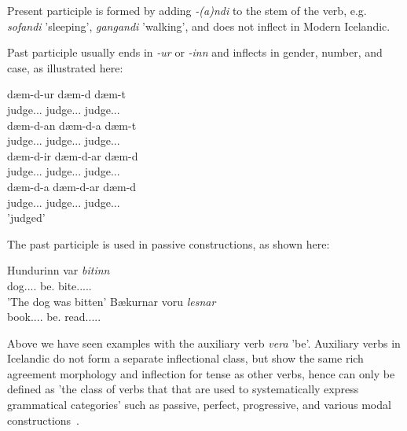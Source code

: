 \documentclass[12pt,%
    times,
]{lin-v2/lin}
\begin{document}
Present participle is formed by adding \emph{-(a)ndi} to the stem of the verb,
e.g. \emph{sof\emph{andi}} 'sleeping', \emph{gang\emph{andi}} 'walking', and does not inflect
in Modern Icelandic.

Past participle usually ends in \emph{-ur} or \emph{-inn} and inflects in gender, number, and case, as illustrated here:
\begin{exe}
    \ex
    \gll dæm-d-ur dæm-d dæm-t\\
    judge.\First\Nom.\Sg.\M{} judge.\First\Nom.\Sg.\F{} judge.\First\Nom.\Sg.\N\\
    \gll dæm-d-an dæm-d-a dæm-t\\
    judge.\First\Acc.\Sg.\M{} judge.\First\Acc.\Sg.\F{} judge.\First\Acc.\Sg.\N\\
    \gll dæm-d-ir dæm-d-ar dæm-d\\
    judge.\First\Nom.\Pl.\M{} judge.\First\Nom.\Pl.\F{} judge.\First\Nom.\Pl.\N\\
    \gll dæm-d-a dæm-d-ar dæm-d\\
    judge.\First\Acc.\Pl.\M{} judge.\First\Acc.\Pl.\F{} judge.\First\Acc.\Pl.\N\\
    \trans 'judged'
\end{exe}

The past participle is used in passive constructions, as shown here:
\begin{exe}
    \ex
    \gll Hundurinn var \emph{bitinn}\\
    dog.\Third\Nom.\Sg.\M.\Def{} be.\Aux{} bite.\Third\Nom.\Sg.\M.\Pst.\Ptcp{}\\
    \trans 'The dog was bitten'
    \ex
    \gll Bækurnar voru \emph{lesnar}\\
    book.\Third\Nom.\Pl.\F.\Def{} be.\Aux{} read.\Third\Nom.\Pl.\F.\Pst.\Ptcp\\
\end{exe}

Above we have seen examples with the auxiliary verb \emph{vera} 'be'.
Auxiliary verbs in Icelandic do not form a separate inflectional class,
but show the same rich agreement morphology and inflection for tense
as other verbs, hence can only be defined as 'the class of verbs that that are used to systematically
express grammatical categories' such as passive, perfect, progressive, and various modal constructions~\citep[10]{icelandic}.
\end{document}
